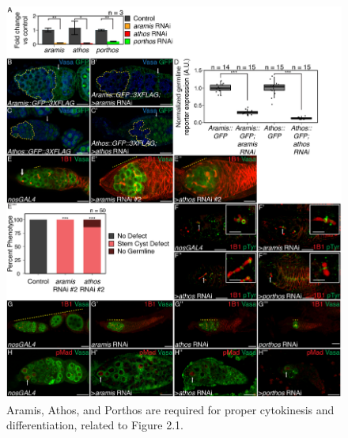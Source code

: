 \documentclass[12pt,oneside]{reedthesis}
\begin{document}
\begin{figure}

{\centering \includegraphics[width=6.5 in,height=8.9375 in]{./figure/Ribosome Biogenesis/Ribosome Biogenesis 1S} 

}

\caption[Aramis, Athos, and Porthos are required for proper cytokinesis and differentiation, related to Figure 2.1.]{Aramis, Athos, and Porthos are required for proper cytokinesis and differentiation, related to Figure 2.1.}\label{fig:unnamed-chunk-7}
\end{figure}
\end{document}
